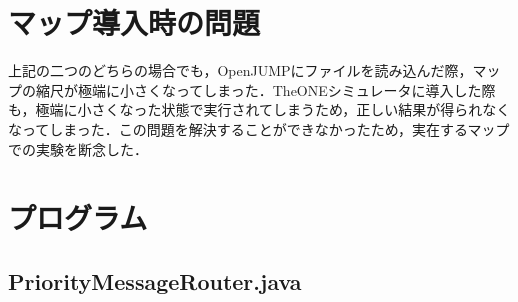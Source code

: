 \documentclass[11pt]{icsthesis}
\begin{document}
\section{マップ導入時の問題}
上記の二つのどちらの場合でも，OpenJUMPにファイルを読み込んだ際，マップの縮尺が極端に小さくなってしまった．TheONEシミュレータに導入した際も，極端に小さくなった状態で実行されてしまうため，正しい結果が得られなくなってしまった．この問題を解決することができなかったため，実在するマップでの実験を断念した．

\newpage

\section{プログラム}
\lstset{
    frame=single,
    numbers=left,
    tabsize=2
}
\subsection{PriorityMessageRouter.java}
\end{document}
